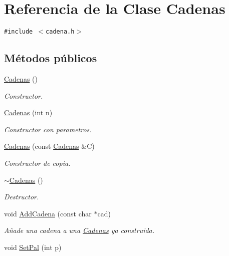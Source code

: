 \hypertarget{class_cadenas}{
\section{Referencia de la Clase Cadenas}
\label{class_cadenas}
}
{\tt \#include $<$cadena.h$>$}

\subsection*{Métodos públicos}
\begin{CompactItemize}
\item 
\hyperlink{class_cadenas_29fe76fae8281718c0e04d56fbbdf6ac}{Cadenas} ()
\begin{CompactList}\small\item\em Constructor. \item\end{CompactList}\item 
\hyperlink{class_cadenas_909303b112dd23c0469003fba49d65e2}{Cadenas} (int n)
\begin{CompactList}\small\item\em Constructor con parametros. \item\end{CompactList}\item 
\hyperlink{class_cadenas_93aec818276ea7a5c0edead83b40c244}{Cadenas} (const \hyperlink{class_cadenas}{Cadenas} \&C)
\begin{CompactList}\small\item\em Constructor de copia. \item\end{CompactList}\item 
\hyperlink{class_cadenas_58595cf21afd1f9d11544dcf962ebccc}{$\sim$Cadenas} ()
\begin{CompactList}\small\item\em Destructor. \item\end{CompactList}\item 
void \hyperlink{class_cadenas_f0a2b9594b2e528f02a3d164740b3250}{AddCadena} (const char $\ast$cad)
\begin{CompactList}\small\item\em Añade una cadena a una \hyperlink{class_cadenas}{Cadenas} ya construida. \item\end{CompactList}\item 
void \hyperlink{class_cadenas_5d74cf072d9fbdbfe35d1b137f9fec23}{SetPal} (int p)

\end{CompactItemize}
